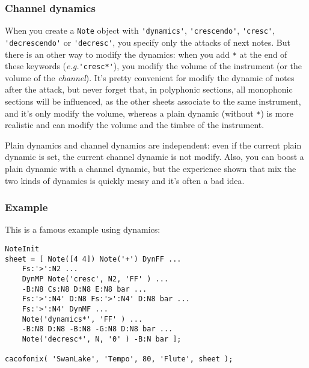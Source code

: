 \documentclass{article}
\newcommand{\note}{\lstinline!Note!\xspace}
\newcommand{\eg}{\emph{e.g.}\xspace}
\begin{document}
\subsubsection{Channel dynamics}
\label{sec:ChannelDynamics}

When you create a \note object with \lstinline!'dynamics'!, \lstinline!'crescendo'!, \lstinline!'cresc'!, \lstinline!'decrescendo'! or \lstinline!'decresc'!, you specify only the attacks of next notes. But there is an other way to modify the dynamics: when you add \lstinline!*! at the end of these keywords (\eg \lstinline!'cresc*'!), you modify the volume of the instrument (or the volume of the \emph{channel}). It's pretty convenient for modify the dynamic of notes after the attack, but never forget that, in polyphonic sections, all monophonic sections will be influenced, as the other sheets associate to the same instrument, and it's only modify the volume, whereas a plain dynamic (without \lstinline!*!) is more realistic and can modify the volume and the timbre of the instrument.

Plain dynamics and channel dynamics are independent: even if the current plain dynamic is set, the current channel dynamic is not modify. Also, you can boost a plain dynamic with a channel dynamic, but the experience shown that mix the two kinds of dynamics is quickly messy and it's often a bad idea.

\subsubsection{Example}

This is a famous example using dynamics: \\

\begin{lstlisting}
NoteInit
sheet = [ Note([4 4]) Note('+') DynFF ...
	Fs:'>':N2 ...
	DynMP Note('cresc', N2, 'FF' ) ...
	-B:N8 Cs:N8 D:N8 E:N8 bar ...
	Fs:'>':N4' D:N8 Fs:'>':N4' D:N8 bar ...
	Fs:'>':N4' DynMF ...
	Note('dynamics*', 'FF' ) ...
	-B:N8 D:N8 -B:N8 -G:N8 D:N8 bar ...
	Note('decresc*', N, '0' ) -B:N bar ];

cacofonix( 'SwanLake', 'Tempo', 80, 'Flute', sheet );
\end{lstlisting}
\end{document}

